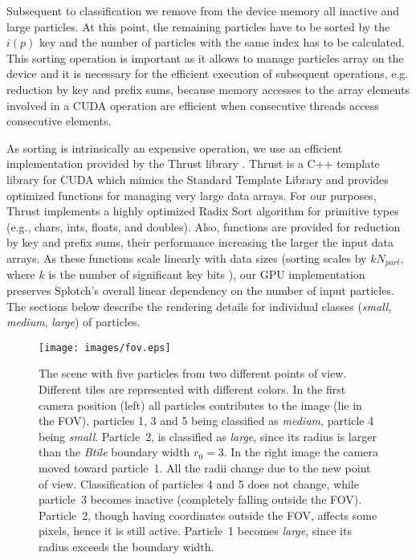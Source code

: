 \documentclass[1p]{elsarticle}
\begin{document}
Subsequent to classification we remove from the device memory all inactive and large particles. At this point, the remaining particles have to be sorted by the $i(p)$ key and the number of particles with the same index has to be calculated.
This sorting operation is important as it allows to manage particles array on the device and it is  
necessary for the efficient execution of subsequent operations, e.g. reduction by key and prefix sums, because memory accesses to the array elements involved in a CUDA operation are efficient when consecutive threads access consecutive elements.

As sorting is intrinsically an expensive operation, we use an efficient implementation provided by the Thrust library \cite{thrusturl}. Thrust is a C++ template library for CUDA which mimics the Standard Template Library and provides optimized functions for managing very large data arrays. For our purposes, Thrust implements a highly optimized Radix Sort algorithm for primitive types (e.g., chars, ints, floats, and doubles). Also, functions are provided for reduction by key and prefix sums, their performance increasing the larger the input data arrays. As these functions scale linearly with data sizes (sorting scales by $kN_{part}$, where $k$ is the number of significant key bits \cite{RadixSort}), our GPU implementation preserves Splotch's overall linear dependency on the number of input particles. The sections below describe the rendering details for individual classes ({\it small}, {\it medium}, {\it large}) of particles.

\begin{figure}
\centering
\texttt{[image: images/fov.eps]}
\caption{The scene with five particles from two different points of view. Different tiles are
represented with different colors. In the first camera position
(left) all particles contributes to the image (lie in the FOV), particles 1, 3 and 5
being classified as {\it medium}, particle 4 being {\it small}. Particle~2, is classified
as {\it large}, since its radius is larger than the {\it Btile} boundary width $r_0=3$. In the right
image the camera moved toward particle~1. All the radii change due to the new point
of view. Classification of particles 4 and 5 does not change, while particle~3
becomes inactive (completely falling outside the FOV). Particle~2, though
having coordinates outside the FOV, affects some pixels, hence it is still active.
Particle~1 becomes {\it large}, since its radius exceeds the boundary width.
}
\label{fig:fov}
\end{figure}
\end{document}
